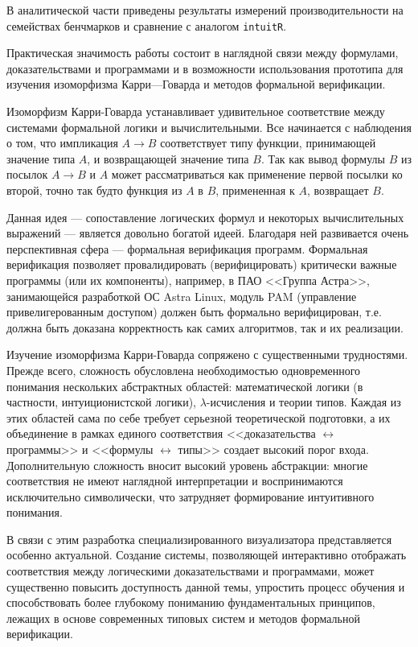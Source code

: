 \documentclass[14pt, russian]{scrartcl}
\begin{document}
В аналитической части приведены результаты измерений производительности на
семействах бенчмарков и сравнение с аналогом \texttt{intuitR}.

Практическая значимость работы состоит в наглядной связи между формулами,
доказательствами и программами и в возможности использования прототипа для
изучения изоморфизма Карри---Говарда и методов формальной верификации.

\newpage
\renewcommand\contentsname{\hfill{\normalfont{СОДЕРЖАНИЕ}}\hfill}  %
\tableofcontents
\newpage
{}  %

Изоморфизм Карри-Говарда устанавливает удивительное соответствие между системами
формальной логики и вычислительными.  Все начинается с наблюдения о том, что
импликация $A \rightarrow B$ соответствует типу функции, принимающей значение
типа $A$, и возвращающей значение типа $B$. Так как вывод формулы $B$ из посылок
$A \rightarrow B$ и $A$ может рассматриваться как применение первой посылки ко
второй, точно так будто функция из $A$ в $B$, примененная к $A$, возвращает $B$. 

Данная идея --- сопоставление логических формул и некоторых вычислительных
выражений --- является довольно богатой идеей.  Благодаря ней развивается очень
перспективная сфера --- формальная верификация программ. Формальная верификация
позволяет провалидировать (верифицировать) критически важные программы (или их
компоненты), например, в ПАО <<Группа Астра>>, занимающейся разработкой ОС Astra
Linux, модуль PAM (управление привелигерованным доступом) должен быть формально
верифицирован, т.е. должна быть доказана корректность как самих алгоритмов, так и
их реализации.

Изучение изоморфизма Карри-Говарда сопряжено с существенными трудностями. Прежде
всего, сложность обусловлена необходимостью одновременного понимания нескольких
абстрактных областей: математической логики (в частности, интуиционистской
логики), $\lambda$-исчисления и теории типов. Каждая из этих областей сама по
себе требует серьезной теоретической подготовки, а их объединение в рамках
единого соответствия <<доказательства $\leftrightarrow$ программы>> и <<формулы
$\leftrightarrow$ типы>> создает высокий порог входа. Дополнительную сложность
вносит высокий уровень абстракции: многие соответствия не имеют наглядной
интерпретации и воспринимаются исключительно символически, что затрудняет
формирование интуитивного понимания.

В связи с этим разработка специализированного визуализатора представляется
особенно актуальной. Создание системы, позволяющей интерактивно отображать
соответствия между логическими доказательствами и программами, может существенно
повысить доступность данной темы, упростить процесс обучения и способствовать
более глубокому пониманию фундаментальных принципов, лежащих в основе
современных типовых систем и методов формальной верификации.
\end{document}
